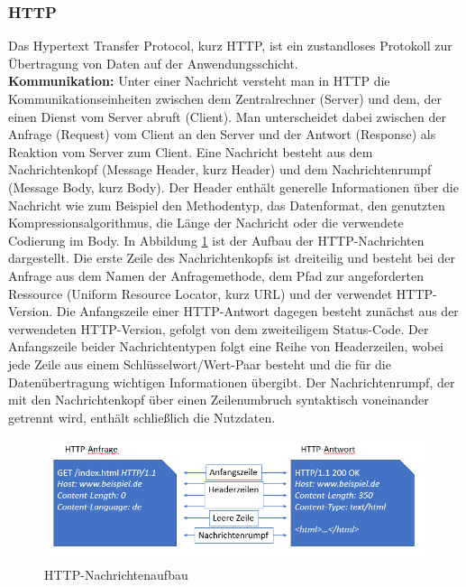 \noindent
\subsubsection{HTTP}
Das Hypertext Transfer Protocol, kurz HTTP, ist ein zustandloses Protokoll zur Übertragung von Daten auf der Anwendungsschicht. \\

\noindent
{}
\textbf{Kommunikation:}
Unter einer Nachricht versteht man in HTTP die Kommunikationseinheiten zwischen dem Zentralrechner (Server) und dem, der einen Dienst vom Server abruft (Client). 
Man unterscheidet dabei zwischen der Anfrage (Request) vom Client an den Server und der Antwort (Response) als Reaktion vom Server zum Client. 
\newline
\noindent
Eine Nachricht besteht aus dem Nachrichtenkopf (Message Header, kurz Header) und dem Nachrichtenrumpf (Message Body, kurz Body). 
Der Header enthält generelle Informationen über die Nachricht wie zum Beispiel den Methodentyp, das Datenformat, den genutzten Kompressionsalgorithmus, die Länge der Nachricht oder die verwendete Codierung im Body. 
\newline
\noindent
In Abbildung \ref{fig:HTTPNachricht} ist der Aufbau der HTTP-Nachrichten dargestellt.
Die erste Zeile des Nachrichtenkopfs ist dreiteilig und besteht bei der Anfrage aus dem Namen der Anfragemethode, dem Pfad zur angeforderten Ressource (Uniform Resource Locator, kurz URL) und der verwendet HTTP-Version. Die Anfangszeile einer HTTP-Antwort dagegen besteht zunächst aus der verwendeten HTTP-Version, gefolgt von dem zweiteiligem Status-Code. 
Der Anfangszeile beider Nachrichtentypen folgt eine Reihe von Headerzeilen, wobei jede Zeile aus einem Schlüsselwort/Wert-Paar besteht und die für die Datenübertragung wichtigen Informationen übergibt. 
Der Nachrichtenrumpf, der mit den Nachrichtenkopf über einen Zeilenumbruch syntaktisch voneinander getrennt wird, enthält schließlich die Nutzdaten.
\newline

\begin{figure}[tbt]
\centering
\includegraphics[width=\textwidth]{images/netzwerkprotokolle_http.PNG}
\caption{HTTP-Nachrichtenaufbau}
\label{fig:HTTPNachricht}
\end{figure}

